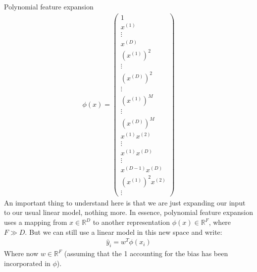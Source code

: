 \begin{parag}{Polynomial feature expansion}
\begin{align*}
		\phi\left(x\right) = \begin{pmatrix} 1 \\ x^{\left(1\right)} \\ \vdots \\ x^{\left(D\right)} \\ \left(x^{\left(1\right)}\right)^2 \\ \vdots \\ \left(x^{\left(D\right)}\right)^2 \\ \vdots \\ \left(x^{\left(1\right)}\right)^{M} \\ \vdots \\ \left(x^{\left(D\right)}\right)^{M} \\ x^{\left(1\right)}x^{\left(2\right)} \\ \vdots \\ x^{\left(1\right)}x^{\left(D\right)} \\ \vdots \\ x^{\left(D - 1\right)}x^{\left(D\right)} \\ \left(x^{\left(1\right)}\right)^2x^{\left(2\right)} \\ \vdots \end{pmatrix} 
	\end{align*}
	An important thing to understand here is that we are just expanding our input to our usual linear model, nothing more. In essence, polynomial feature expansion uses a mapping from $x \in \mathbb{R}^{D}$ to another representation $\phi\left(x\right) \in \mathbb{R}^{F}$, where $F \gg D$. But we can still use a linear model in this new space and write:
	\begin{align*} 
		\hat{y}_i = w^{T}\phi\left(x_i\right)
	\end{align*}
	Where now $w \in \mathbb{R}^{F}$ (assuming that the 1 accounting for the bias has been incorporated in $\phi$). 
\end{parag}
